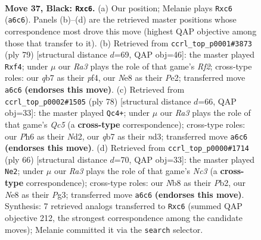 \documentclass[11pt]{article}
\begin{document}
\clearpage

\begin{figure}[p]\centering
\begin{subfigure}{0.46\textwidth}\centering
\resizebox{\linewidth}{!}{%
\newchessgame
\chessboard[
  setfen={1n2nk2/1Q5p/r1P4p/p4p1P/P4q2/1N6/6K1/RN6 b - - 0 37},
  showmover=false,
  pgfstyle=straightmove, color=movearrow, markmove={a6-c6}
]}
\caption{}
\end{subfigure}\hfill
\begin{subfigure}{0.46\textwidth}\centering
\resizebox{\linewidth}{!}{%
\newchessgame
\chessboard[
  setfen={7k/p4r1p/4Q3/1P2n3/PP1q1P2/8/4p1NP/6RK b - - 3 40},
  showmover=false,
  pgfstyle=straightmove, color=movearrow, markmove={f7-f4}
]}
\caption{}
\end{subfigure}
\\[4pt]
\begin{subfigure}{0.46\textwidth}\centering
\resizebox{\linewidth}{!}{%
\newchessgame
\chessboard[
  setfen={3r1nk1/1q4p1/7p/2Q1p3/R3P3/3nP1PP/3N3N/6K1 w - - 0 40},
  showmover=false,
  pgfstyle=straightmove, color=movearrow, markmove={c5-c4}
]}
\caption{}
\end{subfigure}\hfill
\begin{subfigure}{0.46\textwidth}\centering
\resizebox{\linewidth}{!}{%
\newchessgame
\chessboard[
  setfen={1kbr4/4RQ2/1pp4p/3p3P/1q1P4/2N3P1/1P3P2/6K1 w - - 1 34},
  showmover=false,
  pgfstyle=straightmove, color=movearrow, markmove={c3-e2}
]}
\caption{}
\end{subfigure}
\caption{\textbf{Move 37, Black: \texttt{Rxc6}.} (a) Our position; Melanie plays \texttt{Rxc6} (\texttt{a6c6}). Panels (b)--(d) are the retrieved master positions whose correspondence most drove this move (highest QAP objective among those that transfer to it). (b) Retrieved from \texttt{ccrl\_top\_p0001\#3873} (ply 79) [structural distance $d$=69, QAP obj=46]: the master played \texttt{Rxf4}; under $\mu$ our \emph{Ra3} plays the role of that game's \emph{Rf2}; cross-type roles: our \emph{q}b7 as their \emph{p}f4, our \emph{N}e8 as their \emph{P}e2; transferred move \texttt{a6c6} \textbf{(endorses this move)}. (c) Retrieved from \texttt{ccrl\_top\_p0002\#1505} (ply 78) [structural distance $d$=66, QAP obj=33]: the master played \texttt{Qc4+}; under $\mu$ our \emph{Ra3} plays the role of that game's \emph{Qc5} (a \textbf{cross-type} correspondence); cross-type roles: our \emph{P}h6 as their \emph{N}d2, our \emph{q}b7 as their \emph{n}d3; transferred move \texttt{a6c6} \textbf{(endorses this move)}. (d) Retrieved from \texttt{ccrl\_top\_p0000\#1714} (ply 66) [structural distance $d$=70, QAP obj=33]: the master played \texttt{Ne2}; under $\mu$ our \emph{Ra3} plays the role of that game's \emph{Nc3} (a \textbf{cross-type} correspondence); cross-type roles: our \emph{N}b8 as their \emph{P}b2, our \emph{N}e8 as their \emph{P}g3; transferred move \texttt{a6c6} \textbf{(endorses this move)}. Synthesis: 7 retrieved analogs transferred to \texttt{Rxc6} (summed QAP objective 212, the strongest correspondence among the candidate moves); Melanie committed it via the \texttt{search} selector.}
\label{fig:thought-m73}
\end{figure}
\end{document}
